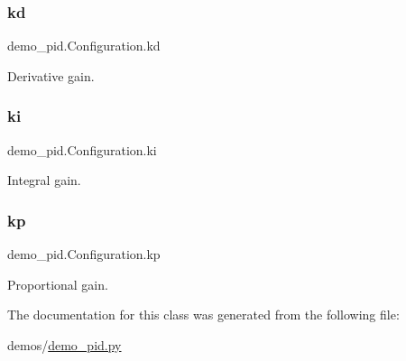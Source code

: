 \subsubsection{\texorpdfstring{kd}{kd}}
{\footnotesize\ttfamily demo\+\_\+pid.\+Configuration.\+kd}



Derivative gain. 

\mbox{\label{classdemo__pid_1_1Configuration_aa6b6f403f267c691d9f44314f379b890}} 
\subsubsection{\texorpdfstring{ki}{ki}}
{\footnotesize\ttfamily demo\+\_\+pid.\+Configuration.\+ki}



Integral gain. 

\mbox{\label{classdemo__pid_1_1Configuration_a41bebe94c285c00d9f0a536054ff0823}} 
\subsubsection{\texorpdfstring{kp}{kp}}
{\footnotesize\ttfamily demo\+\_\+pid.\+Configuration.\+kp}



Proportional gain. 



The documentation for this class was generated from the following file\+:\begin{DoxyCompactItemize}
\item 
demos/\hyperlink{demo__pid_8py}{demo\+\_\+pid.\+py}\end{DoxyCompactItemize}
